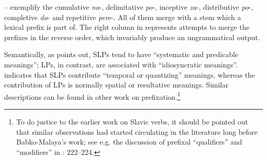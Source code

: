 \documentclass[output=paper,colorlinks,citecolor=brown]{langscibook}
\begin{document}
\noindent {}-- exemplify the cumulative \textit{na}-, delimitative \textit{po}-, inceptive \textit{za}-, distributive \textit{po}-, completive \textit{do}- and repetitive \textit{pere}-. All of them merge with a stem which a lexical prefix is part of. The right column in  represents attempts to merge the prefixes in the reverse order, which invariably produce an ungrammatical output.

Semantically, as \citet[][76]{BabkoMalaya1999} points out, SLPs tend to have “systematic and predicable meanings”; LPs, in contrast, are associated with “idiosyncratic meanings”. \citet[][230]{Svenonius2004} indicates that SLPs contribute “temporal or quantizing” meanings, whereas the contribution of LPs is normally spatial or resultative meanings. Similar descriptions can be found in other work on prefixation.\footnote{To do justice to the earlier work on Slavic verbs, it should be pointed out that similar observations had started circulating in the literature long before Babko-Malaya’s work; see e.g. the discussion of prefixal “qualifiers” and “modifiers” in \citet{Isacenko1960}: 222--224.} 






\end{document}
